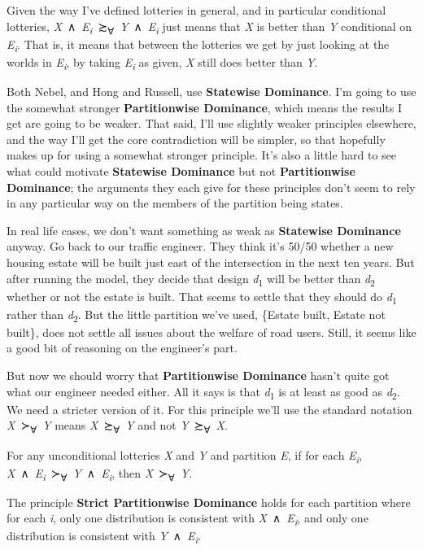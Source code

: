 \documentclass[
  11pt,
  letterpaper,
  DIV=11,
  numbers=noendperiod,
  twoside]{scrartcl}
\providecommand{\tightlist}{%
  \setlength{\itemsep}{0pt}\setlength{\parskip}{0pt}}
\begin{document}
Given the way I've defined lotteries in general, and in particular
conditional lotteries,
\emph{X}~∧~\emph{E\textsubscript{i}}~≿\textsubscript{∀}~\emph{Y}~∧~\emph{E\textsubscript{i}}
just means that \emph{X} is better than \emph{Y} conditional on
\emph{E\textsubscript{i}}. That is, it means that between the lotteries
we get by just looking at the worlds in \emph{E\textsubscript{i}}, by
taking \emph{E\textsubscript{i}} as given, \emph{X} still does better
than \emph{Y}.

Both Nebel, and Hong and Russell, use \textbf{Statewise Dominance}. I'm
going to use the somewhat stronger \textbf{Partitionwise Dominance},
which means the results I get are going to be weaker. That said, I'll
use slightly weaker principles elsewhere, and the way I'll get the core
contradiction will be simpler, so that hopefully makes up for using a
somewhat stronger principle. It's also a little hard to see what could
motivate \textbf{Statewise Dominance} but not \textbf{Partitionwise
Dominance}; the arguments they each give for these principles don't seem
to rely in any particular way on the members of the partition being
states.

In real life cases, we don't want something as weak as \textbf{Statewise
Dominance} anyway. Go back to our traffic engineer. They think it's
50/50 whether a new housing estate will be built just east of the
intersection in the next ten years. But after running the model, they
decide that design \emph{d}\textsubscript{1} will be better than
\emph{d}\textsubscript{2} whether or not the estate is built. That seems
to settle that they should do \emph{d}\textsubscript{1} rather than
\emph{d}\textsubscript{2}. But the little partition we've used, \{Estate
built, Estate not built\}, does not settle all issues about the welfare
of road users. Still, it seems like a good bit of reasoning on the
engineer's part.

But now we should worry that \textbf{Partitionwise Dominance} hasn't
quite got what our engineer needed either. All it says is that
\emph{d}\textsubscript{1} is at least as good as
\emph{d}\textsubscript{2}. We need a stricter version of it. For this
principle we'll use the standard notation
\emph{X}~≻\textsubscript{∀}~\emph{Y} means
\emph{X}~≿\textsubscript{∀}~\emph{Y} and not
\emph{Y}~≿\textsubscript{∀}~\emph{X}.

\begin{description}
\tightlist
\item[Strict Partitionwise Dominance]
For any unconditional lotteries \emph{X} and \emph{Y} and partition
\emph{E}, if for each \emph{E\textsubscript{i}},
\emph{X}~∧~\emph{E\textsubscript{i}}~≻\textsubscript{∀}~\emph{Y}~∧~\emph{E\textsubscript{i}},
then \emph{X}~≻\textsubscript{∀}~\emph{Y}.
\item[Strict Statewise Dominance]
The principle \textbf{Strict Partitionwise Dominance} holds for each
partition where for each \emph{i}, only one distribution is consistent
with \emph{X}~∧~\emph{E\textsubscript{i}}, and only one distribution is
consistent with \emph{Y}~∧~\emph{E\textsubscript{i}}.
\end{description}
\end{document}
